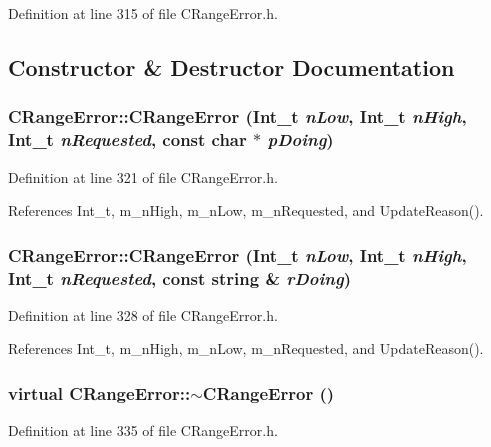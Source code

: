 Definition at line 315 of file CRange\-Error.h.

\subsection{Constructor \& Destructor Documentation}
\subsubsection{\setlength{\rightskip}{0pt plus 5cm}CRange\-Error::CRange\-Error ({\bf Int\_\-t} {\em n\-Low}, {\bf Int\_\-t} {\em n\-High}, {\bf Int\_\-t} {\em n\-Requested}, const char $\ast$ {\em p\-Doing})\hspace{0.3cm}{\tt  [inline]}}\label{classCRangeError_a0}




Definition at line 321 of file CRange\-Error.h.

References Int\_\-t, m\_\-n\-High, m\_\-n\-Low, m\_\-n\-Requested, and Update\-Reason().
\subsubsection{\setlength{\rightskip}{0pt plus 5cm}CRange\-Error::CRange\-Error ({\bf Int\_\-t} {\em n\-Low}, {\bf Int\_\-t} {\em n\-High}, {\bf Int\_\-t} {\em n\-Requested}, const string \& {\em r\-Doing})\hspace{0.3cm}{\tt  [inline]}}\label{classCRangeError_a1}




Definition at line 328 of file CRange\-Error.h.

References Int\_\-t, m\_\-n\-High, m\_\-n\-Low, m\_\-n\-Requested, and Update\-Reason().
\subsubsection{\setlength{\rightskip}{0pt plus 5cm}virtual CRange\-Error::$\sim$CRange\-Error ()\hspace{0.3cm}{\tt  [inline, virtual]}}\label{classCRangeError_a2}




Definition at line 335 of file CRange\-Error.h.
